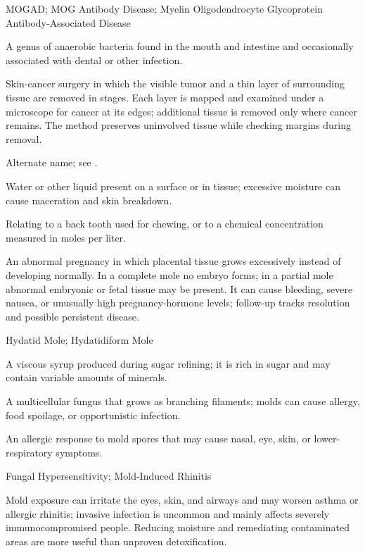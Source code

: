 \synonyms
MOGAD; MOG Antibody Disease; Myelin Oligodendrocyte Glycoprotein Antibody-Associated Disease

 A genus of anaerobic bacteria found in the mouth and intestine and occasionally associated with dental or other infection.

 Skin-cancer surgery in which the visible tumor and a thin
layer of surrounding tissue are removed in stages. Each layer is mapped and examined
under a microscope for cancer at its edges; additional tissue is removed only where
cancer remains. The method preserves uninvolved tissue while checking margins during removal.

 Alternate name; see .

 Water or other liquid present on a surface or in tissue; excessive moisture can cause maceration and skin breakdown.

 Relating to a back tooth used for chewing, or to a chemical concentration measured in moles per liter.

 An abnormal pregnancy in which placental tissue grows excessively instead of developing normally. In a complete mole no embryo forms; in a partial mole abnormal embryonic or fetal tissue may be present. It can cause bleeding, severe nausea, or unusually high pregnancy-hormone levels; follow-up tracks resolution and possible persistent disease.

\synonyms
Hydatid Mole; Hydatidiform Mole

 A viscous syrup produced during sugar refining; it is rich in sugar and may contain variable amounts of minerals.

 A multicellular fungus that grows as branching filaments; molds can cause allergy, food spoilage, or opportunistic infection.

 An allergic response to mold spores that may cause nasal, eye, skin, or lower-respiratory symptoms.

\synonyms
Fungal Hypersensitivity; Mold-Induced Rhinitis

 Mold exposure can irritate the eyes, skin, and airways and may worsen asthma or allergic rhinitis; invasive infection is uncommon and mainly affects severely immunocompromised people. Reducing moisture and remediating contaminated areas are more useful than unproven detoxification.

